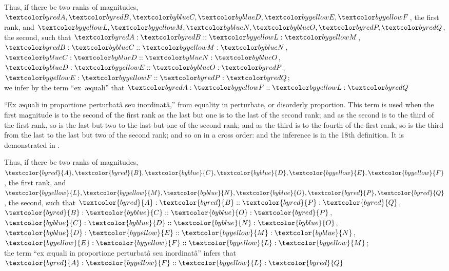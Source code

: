 \documentclass[booklanguage=english]{byrnebook}
\begin{document}
\begin{center}
Thus, if there be two ranks of magnitudes,\\
$\varA, \varB, \varC, \varD, \varE, \varF$, the first rank,
and $\varL, \varM, \varN, \varO, \varP, \varQ$, the second,
such that $\varA : \varB :: \varL : \varM$, $\varB : \varC :: \varM : \varN$, $\varC : \varD :: \varN : \varO$, $\varD : \varE :: \varO : \varP$, $\varE : \varF :: \varP : \varQ$;\\
we infer by the term \enquote{ex~æquali} that $\varA : \varF :: \varL : \varQ$
\end{center}

\def\varA{\textcolor{byred}{A}}
\def\varB{\textcolor{byred}{B}}
\def\varC{\textcolor{byblue}{C}}
\def\varD{\textcolor{byblue}{D}}
\def\varE{\textcolor{byyellow}{E}}
\def\varF{\textcolor{byyellow}{F}}
\def\varL{\textcolor{byyellow}{L}}
\def\varM{\textcolor{byyellow}{M}}
\def\varN{\textcolor{byblue}{N}}
\def\varO{\textcolor{byblue}{O}}
\def\varP{\textcolor{byred}{P}}
\def\varQ{\textcolor{byred}{Q}}
\enquote{Ex æquali in proportione perturbatâ seu inordinatâ,} from equality in perturbate, or disorderly proportion. This term is used when the first magnitude is to the second of the first rank as the last but one is to the last of the second rank; and as the second is to the third of the first rank, so is the last but two to the last but one of the second rank; and as the third is to the fourth of the first rank, so is the third from the last to the last but two of the second rank; and so on in a cross order: and the inference is in the 18th definition. It is demonstrated in .

\begin{center}
Thus, if there be two ranks of magnitudes,\\
$\varA, \varB, \varC, \varD, \varE, \varF$, the first rank,
and $\varL, \varM, \varN, \varO, \varP, \varQ$, the second,
such that $\varA : \varB :: \varP : \varQ$, $\varB : \varC :: \varO : \varP$, $\varC : \varD :: \varN : \varO$, $\varD : \varE :: \varM : \varN$, $\varE : \varF :: \varL : \varM$;\\
the term \enquote{ex æquali in proportione perturbatâ seu inordinatâ} infers that $\varA : \varF :: \varL : \varQ$
\end{center}

\vfill\pagebreak

\end{document}
